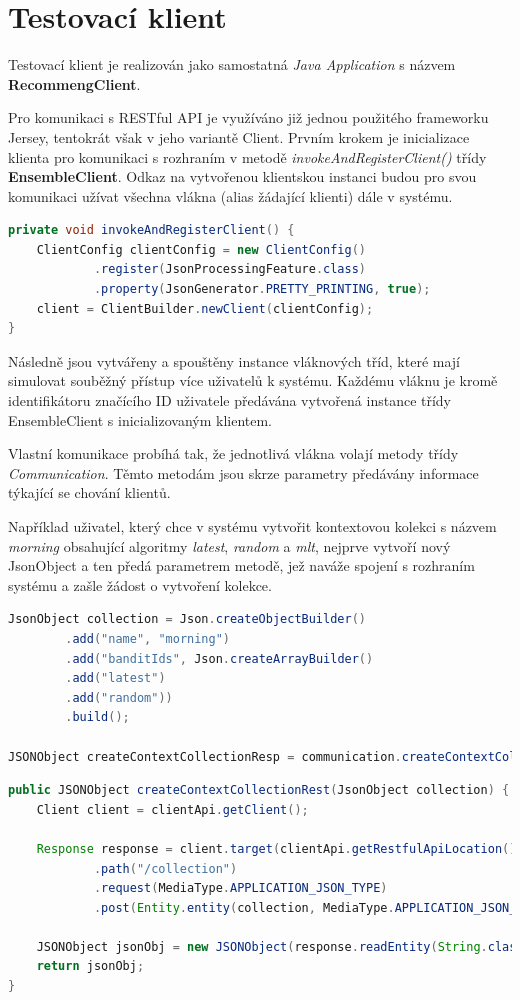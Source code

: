 \documentclass[thesis=M,czech]{FITthesis}[2014/05/07]
\begin{document}
\section{Testovací klient}
\label{chap:client}
Testovací klient je realizován jako samostatná \emph{Java Application} s názvem \textbf{RecommengClient}.

Pro komunikaci s RESTful API je využíváno již jednou použitého frameworku Jersey, tentokrát však v jeho variantě Client. Prvním krokem je inicializace klienta pro komunikaci s rozhraním v metodě \emph{invokeAndRegisterClient()} třídy \textbf{EnsembleClient}. Odkaz na vytvořenou klientskou instanci budou pro svou komunikaci užívat všechna vlákna (alias žádající klienti) dále v systému.

\begin{lstlisting}[language=java]
private void invokeAndRegisterClient() {
    ClientConfig clientConfig = new ClientConfig()
            .register(JsonProcessingFeature.class)
            .property(JsonGenerator.PRETTY_PRINTING, true);
    client = ClientBuilder.newClient(clientConfig);        
}   
\end{lstlisting}

Následně jsou vytvářeny a spouštěny instance vláknových tříd, které mají simulovat souběžný přístup více uživatelů k systému. Každému vláknu je kromě identifikátoru značícího ID uživatele předávána vytvořená instance třídy EnsembleClient s inicializovaným klientem.

Vlastní komunikace probíhá tak, že jednotlivá vlákna volají metody třídy \emph{Communication}. Těmto metodám jsou skrze parametry předávány informace týkající se chování klientů.

Například uživatel, který chce v systému vytvořit kontextovou kolekci s názvem \emph{morning} obsahující algoritmy \emph{latest}, \emph{random} a \emph{mlt}, nejprve vytvoří nový JsonObject a ten předá parametrem metodě, jež naváže spojení s rozhraním systému a zašle žádost o vytvoření kolekce.

\begin{lstlisting}[language=java]
JsonObject collection = Json.createObjectBuilder()
        .add("name", "morning")
        .add("banditIds", Json.createArrayBuilder()
        .add("latest")
        .add("random"))
        .build();

JSONObject createContextCollectionResp = communication.createContextCollectionRest(collection);
\end{lstlisting}

\begin{lstlisting}[language=java]
public JSONObject createContextCollectionRest(JsonObject collection) {
    Client client = clientApi.getClient();

    Response response = client.target(clientApi.getRestfulApiLocation())
            .path("/collection")
            .request(MediaType.APPLICATION_JSON_TYPE)
            .post(Entity.entity(collection, MediaType.APPLICATION_JSON_TYPE));

    JSONObject jsonObj = new JSONObject(response.readEntity(String.class));
    return jsonObj;
}
\end{lstlisting}
\end{document}
